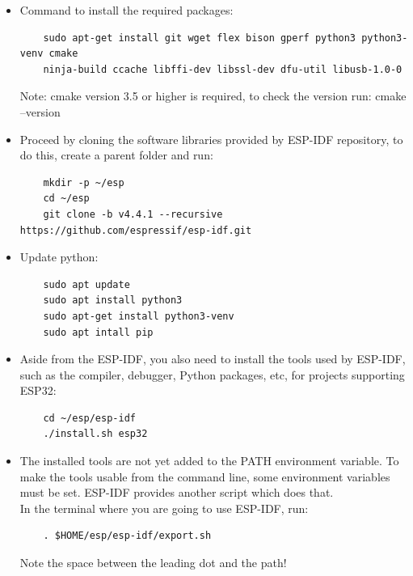 \begin{itemize}
    \item Command to install the required packages:
    \begin{verbatim}
    sudo apt-get install git wget flex bison gperf python3 python3-venv cmake 
    ninja-build ccache libffi-dev libssl-dev dfu-util libusb-1.0-0
    \end{verbatim}

    Note: cmake version 3.5 or higher is required, to check the version run: cmake --version
    
    \item Proceed by cloning the software libraries provided by ESP-IDF repository, to do this, create a parent folder and run:
    \begin{verbatim}
    mkdir -p ~/esp
    cd ~/esp
    git clone -b v4.4.1 --recursive https://github.com/espressif/esp-idf.git
    \end{verbatim}

    
    
    \item Update python:
    \begin{verbatim}
    sudo apt update
    sudo apt install python3
    sudo apt-get install python3-venv
    sudo apt intall pip
    \end{verbatim}


    \item Aside from the ESP-IDF, you also need to install the tools used by ESP-IDF, such as the compiler, debugger, Python packages, etc, for projects supporting ESP32:
    \begin{verbatim}
    cd ~/esp/esp-idf
    ./install.sh esp32
    \end{verbatim}

    
    \item The installed tools are not yet added to the PATH environment variable. To make the tools usable from the command line, some environment variables must be set. ESP-IDF provides another script which does that.\\
    
    In the terminal where you are going to use ESP-IDF, run:
    \begin{verbatim}
    . $HOME/esp/esp-idf/export.sh 
    \end{verbatim}
    
    Note the space between the leading dot and the path!

\end{itemize}

